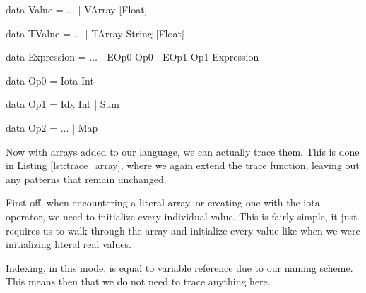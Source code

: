         \begin{haskell}[caption=Adding arrays, label=lst:language_array, gobble=12]
            data Value = $\ldots$ | VArray [Float]
                
            data TValue = $\ldots$ | TArray String [Float]

            data Expression
                = $\ldots$
                | EOp0 Op0
                | EOp1 Op1 Expression

            data Op0 = Iota Int
            
            data Op1 = Idx Int | Sum

            data Op2 = $\ldots$ | Map
        \end{haskell}

        Now with arrays added to our language, we can actually trace them.
        This is done in Listing \ref{lst:trace_array}, where we again extend the trace function, leaving out any patterns that remain unchanged.
        
        First off, when encountering a literal array, or creating one with the iota operator, we need to initialize every individual value.
        This is fairly simple, it just requires us to walk through the array and initialize every value like when we were initializing literal real values.

        Indexing, in this mode, is equal to variable reference due to our naming scheme.
        This means then that we do not need to trace anything here.

